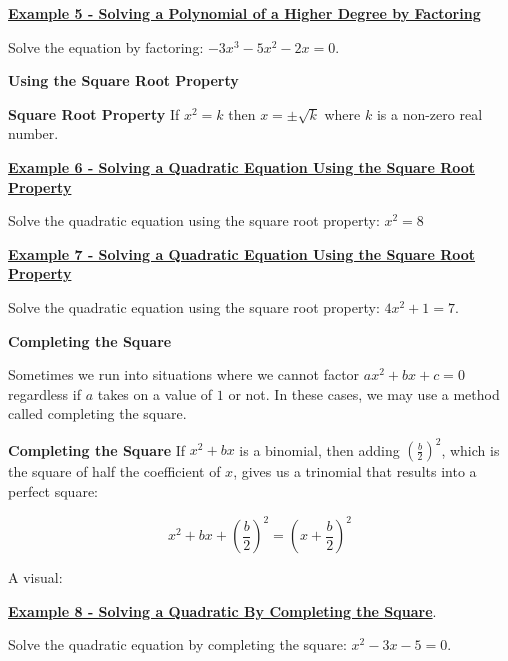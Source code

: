 \documentclass[12pt]{book}
\begin{document}
\underline{\textbf{Example 5 - Solving a Polynomial of a Higher Degree by Factoring}}

Solve the equation by factoring: $-3x^3-5x^2-2x=0$.
\vspace{50mm}

{\large \textbf{Using the Square Root Property}}

\begin{boxR}
    \textbf{Square Root Property}
     \vspace{1mm}
    \hline
    \vspace{2mm}
    If $x^2 = k$ then $x = \pm \sqrt{k}$ where $k$ is a non-zero real number.
\end{boxR}
\vspace{3mm}

\underline{\textbf{Example 6 - Solving a Quadratic Equation Using the Square Root Property}}

Solve the quadratic equation using the square root property: $x^2=8$
 \newpage

 \underline{\textbf{Example 7 - Solving a Quadratic Equation Using the Square Root Property}}

Solve the quadratic equation using the square root property: $4x^2+1=7$.

\vspace{25mm}
{\large \textbf{Completing the Square}}

Sometimes we run into situations where we cannot factor $ax^2 +bx+c =0$ regardless if $a$ takes on a value of $1$ or not. In these cases, we may use a method called completing the square.

\begin{boxR}
    \textbf{Completing the Square}
    \vspace{1mm}
     \hline
    \vspace{2mm}
    If $x^2+bx$ is a binomial, then adding $\left(\frac{b}{2}\right)^2$, which is the square of half the coefficient of $x$, gives us a trinomial that results into a perfect square: 

    $$ x^2 +bx + \left(\frac{b}{2}\right)^2 = \left(x+\frac{b}{2}\right)^2$$
\end{boxR}
A visual: 

\vspace{45mm}
 \underline{\textbf{Example 8 - Solving a Quadratic By Completing the Square}}.

Solve the quadratic equation by completing the square: $x^2-3x-5=0$. 

\newpage
\end{document}
